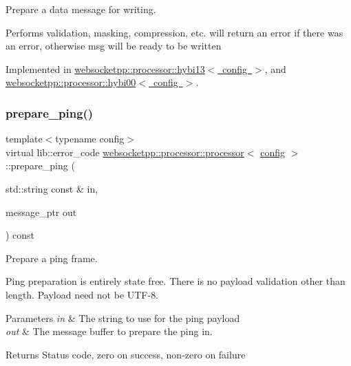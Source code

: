 Prepare a data message for writing. 

Performs validation, masking, compression, etc. will return an error if there was an error, otherwise msg will be ready to be written 

Implemented in \mbox{\hyperlink{classwebsocketpp_1_1processor_1_1hybi13_a72f4833d66eb51e37a956f434895b3ab}{websocketpp\+::processor\+::hybi13$<$ config $>$}}, and \mbox{\hyperlink{classwebsocketpp_1_1processor_1_1hybi00_a919aaed345cab679875be1d95c7302ec}{websocketpp\+::processor\+::hybi00$<$ config $>$}}.

\mbox{\label{classwebsocketpp_1_1processor_1_1processor_aae3f34ae169c9b5e588cf268e310d6e2}} 
\subsubsection{\texorpdfstring{prepare\+\_\+ping()}{prepare\_ping()}}
{\footnotesize\ttfamily template$<$typename config$>$ \\
virtual lib\+::error\+\_\+code \mbox{\hyperlink{classwebsocketpp_1_1processor_1_1processor}{websocketpp\+::processor\+::processor}}$<$ \mbox{\hyperlink{classconfig}{config}} $>$\+::prepare\+\_\+ping (\begin{DoxyParamCaption}\item[{std\+::string const \&}]{in,  }\item[{message\+\_\+ptr}]{out }\end{DoxyParamCaption}) const\hspace{0.3cm}{\ttfamily [pure virtual]}}



Prepare a ping frame. 

Ping preparation is entirely state free. There is no payload validation other than length. Payload need not be U\+T\+F-\/8.


\begin{DoxyParams}{Parameters}
{\em in} & The string to use for the ping payload \\
\hline
{\em out} & The message buffer to prepare the ping in. \\
\hline
\end{DoxyParams}
\begin{DoxyReturn}{Returns}
Status code, zero on success, non-\/zero on failure 
\end{DoxyReturn}


